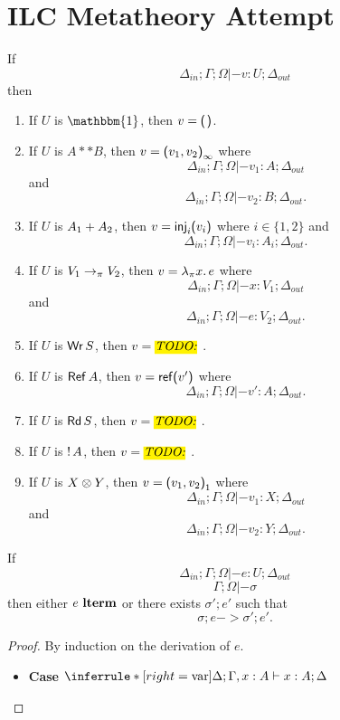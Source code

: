 \section{ILC Metatheory Attempt}

\begin{lemma}
  If \[\Delta_{in} ; \Gamma ; \Omega |- v : U ; \Delta_{out}\] then
  \begin{enumerate}
  \item If $U$ is $\mathbbm{1}$, then $v = \eUnit$.
  \item If $U$ is $A ** B$, then $v = \textsf{(}{v_1},{v_2}\textsf{)}_{\infty}$ where \[\Delta_{in} ; \Gamma ; \Omega |-
    v_1 : A ; \Delta_{out}\] and \[\Delta_{in} ; \Gamma ; \Omega |- v_2 : B ; \Delta_{out}.\]
  \item If $U$ is ${A_1} + {A_2}$, then $v = \text{\textsf{inj}}_{i}\textsf{(} v_i\textsf{)}$
    where $i \in \{1, 2\}$ and \[\Delta_{in} ; \Gamma ; \Omega |- v_i : A_i ; \Delta_{out}.\]
  \item If $U$ is ${V_1}\rightarrow_{\pi}{V_2}$, then $v = \lambda_{\pi} {x}.\,{e}$
    where \[\Delta_{in} ; \Gamma ; \Omega |- x : V_1 ; \Delta_{out}\] and \[\Delta_{in} ; \Gamma ; \Omega |- e :
    V_2 ; \Delta_{out}.\]
  \item If $U$ is $\text{\textsf{Wr}}\,S$, then $v = \todo{}$.
  \item If $U$ is $\text{\textsf{Ref}}\,A$, then $v = \text{\textsf{ref}}\textsf{(}{v'}\textsf{)}$ where \[\Delta_{in} ; \Gamma ; \Omega |- v'
    : A ; \Delta_{out}.\]    
  \item If $U$ is $\text{\textsf{Rd}}\,S$, then $v = \todo{}$.
  \item If $U$ is ${!}\,{A}$, then $v = \todo{}$.
  \item If $U$ is ${X}\otimes{Y}$, then $v = \textsf{(}{v_1},{v_2}\textsf{)}_{1}$
    where \[\Delta_{in} ; \Gamma ; \Omega |- v_1 : X ; \Delta_{out}\] and \[\Delta_{in} ; \Gamma ; \Omega |- v_2 : Y
    ; \Delta_{out}.\]    
  \end{enumerate}
\end{lemma}

\begin{theorem}
  If \[\Delta_{in} ; \Gamma ; \Omega |- e : U ; \Delta_{out}\] \[\Gamma ; \Omega |- \sigma\]
  then either $e~\textbf{lterm}$ or there exists $\sigma' ; e'$ such that \[\sigma ; e -> \sigma' ; e'.\]
\end{theorem}

\begin{proof}
  By induction on the derivation of $e$.
  \begin{itemize}
  \item \textbf{Case}
      $\Infer{var}
      {}
      {\Delta; \Gamma, x : A |- x : A ; \Delta}$
  \end{itemize}
\end{proof}

